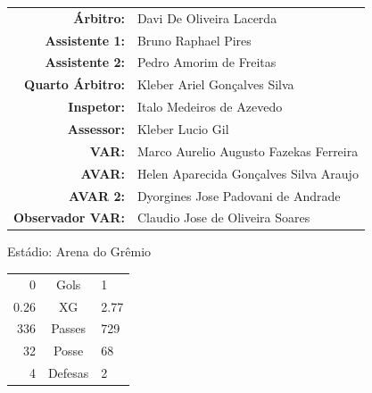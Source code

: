 \documentclass[11pt]{article}
\begin{document}
\vspace{0.5cm}
\begin{minipage}{0.65\textwidth}
\begin{center}
\begin{tabular}{rl}
\textbf{Árbitro:} & Davi De Oliveira Lacerda \\
\textbf{Assistente 1:} & Bruno Raphael Pires \\
\textbf{Assistente 2:} & Pedro Amorim de Freitas \\
\textbf{Quarto Árbitro:} & Kleber Ariel Gonçalves Silva \\
\textbf{Inspetor:} & Italo Medeiros de Azevedo \\
\textbf{Assessor:} & Kleber Lucio Gil \\
\textbf{VAR:} & Marco Aurelio Augusto Fazekas Ferreira \\
\textbf{AVAR:} & Helen Aparecida Gonçalves Silva Araujo \\
\textbf{AVAR 2:} & Dyorgines Jose Padovani de Andrade \\
\textbf{Observador VAR:} & Claudio Jose de Oliveira Soares \\
\end{tabular}
\end{center}
\end{minipage}
\begin{minipage}{0.3\textwidth}
Estádio: Arena do Grêmio\\
\begin{tabular}{rcl}
0 & Gols & 1 \\
0.26 & XG & 2.77 \\
336 & Passes & 729 \\
32 & Posse & 68 \\
4 & Defesas & 2 \\
\end{tabular}
\end{minipage}
\newpage
\end{document}
